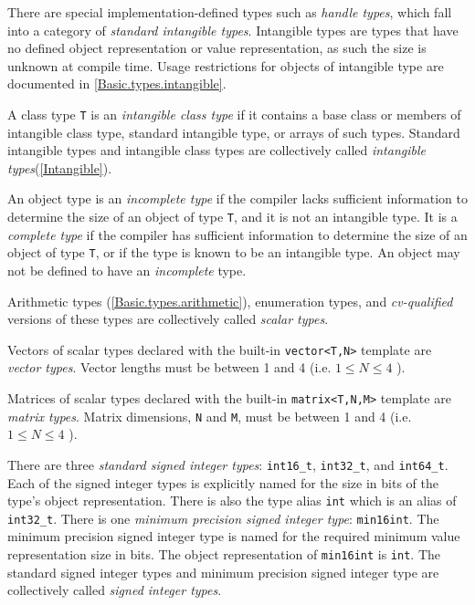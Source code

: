 \p There are special implementation-defined types such as \textit{handle types},
which fall into a category of \textit{standard intangible types}. Intangible
types are types that have no defined object representation or value
representation, as such the size is unknown at compile time. Usage restrictions
for objects of intangible type are documented in \ref{Basic.types.intangible}.

\p A class type \texttt{T} is an \textit{intangible class type} if it contains
a base class or members of intangible class type, standard intangible type,
or arrays of such types. Standard intangible types and intangible class types
are collectively called \textit{intangible types}(\ref{Intangible}).

\p An object type is an \textit{incomplete type} if the compiler lacks
sufficient information to determine the size of an object of type \texttt{T},
and it is not an intangible type. It is a \textit{complete type} if the compiler
has sufficient information to determine the size of an object of type
\texttt{T}, or if the type is known to be an intangible type. An object may not
be defined to have an \textit{incomplete} type.

\p Arithmetic types (\ref{Basic.types.arithmetic}), enumeration types, and
\textit{cv-qualified} versions of these types are collectively called
\textit{scalar types}.

\p Vectors of scalar types declared with the built-in \texttt{vector<T,N>}
template are \textit{vector types}. Vector lengths must be between 1 and 4 (i.e.
\( 1 \leq N \leq 4 \) ).

\p Matrices of scalar types declared with the built-in \texttt{matrix<T,N,M>}
template are \textit{matrix types}. Matrix dimensions, \texttt{N} and
\texttt{M}, must be between 1 and 4 (i.e. \( 1 \leq N \leq 4 \) ).


\p There are three \textit{standard signed integer types}: \texttt{int16\_t},
\texttt{int32\_t}, and \texttt{int64\_t}. Each of the signed integer types is
explicitly named for the size in bits of the type's object representation. There
is also the type alias \texttt{int} which is an alias of \texttt{int32\_t}.
There is one \textit{minimum precision signed integer type}: \texttt{min16int}.
The minimum precision signed integer type is named for the required minimum
value representation size in bits. The object representation of
\texttt{min16int} is \texttt{int}. The standard signed integer types and minimum
precision signed integer type are collectively called \textit{signed integer
types}.

